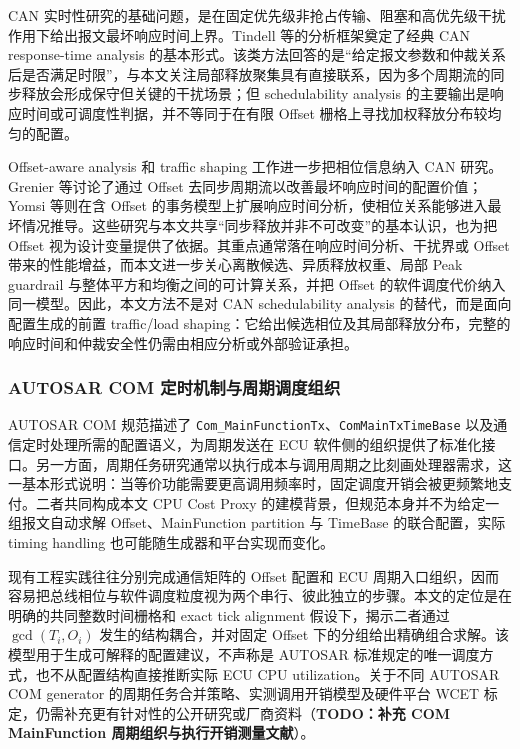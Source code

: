 \documentclass[UTF8,12pt,a4paper]{ctexart}
\begin{document}
CAN 实时性研究的基础问题，是在固定优先级非抢占传输、阻塞和高优先级干扰作用下给出报文最坏响应时间上界。Tindell 等的分析框架奠定了经典 CAN response-time analysis 的基本形式\cite{tindell1994}。该类方法回答的是“给定报文参数和仲裁关系后是否满足时限”，与本文关注局部释放聚集具有直接联系，因为多个周期流的同步释放会形成保守但关键的干扰场景；但 schedulability analysis 的主要输出是响应时间或可调度性判据，并不等同于在有限 Offset 栅格上寻找加权释放分布较均匀的配置。

Offset-aware analysis 和 traffic shaping 工作进一步把相位信息纳入 CAN 研究。Grenier 等讨论了通过 Offset 去同步周期流以改善最坏响应时间的配置价值\cite{grenier2008}；Yomsi 等则在含 Offset 的事务模型上扩展响应时间分析，使相位关系能够进入最坏情况推导\cite{yomsi2012}。这些研究与本文共享“同步释放并非不可改变”的基本认识，也为把 Offset 视为设计变量提供了依据。其重点通常落在响应时间分析、干扰界或 Offset 带来的性能增益，而本文进一步关心离散候选、异质释放权重、局部 Peak guardrail 与整体平方和均衡之间的可计算关系，并把 Offset 的软件调度代价纳入同一模型。因此，本文方法不是对 CAN schedulability analysis 的替代，而是面向配置生成的前置 traffic/load shaping：它给出候选相位及其局部释放分布，完整的响应时间和仲裁安全性仍需由相应分析或外部验证承担。

\subsubsection{AUTOSAR COM 定时机制与周期调度组织}

AUTOSAR COM 规范描述了 \texttt{Com\_MainFunctionTx}、\texttt{ComMainTxTimeBase} 以及通信定时处理所需的配置语义\cite{autosarcom}，为周期发送在 ECU 软件侧的组织提供了标准化接口。另一方面，周期任务研究通常以执行成本与调用周期之比刻画处理器需求\cite{liu1973}，这一基本形式说明：当等价功能需要更高调用频率时，固定调度开销会被更频繁地支付。二者共同构成本文 CPU Cost Proxy 的建模背景，但规范本身并不为给定一组报文自动求解 Offset、MainFunction partition 与 TimeBase 的联合配置，实际 timing handling 也可能随生成器和平台实现而变化。

现有工程实践往往分别完成通信矩阵的 Offset 配置和 ECU 周期入口组织，因而容易把总线相位与软件调度粒度视为两个串行、彼此独立的步骤。本文的定位是在明确的共同整数时间栅格和 exact tick alignment 假设下，揭示二者通过 $\gcd(T_i,O_i)$ 发生的结构耦合，并对固定 Offset 下的分组给出精确组合求解。该模型用于生成可解释的配置建议，不声称是 AUTOSAR 标准规定的唯一调度方式，也不从配置结构直接推断实际 ECU CPU utilization。关于不同 AUTOSAR COM generator 的周期任务合并策略、实测调用开销模型及硬件平台 WCET 标定，仍需补充更有针对性的公开研究或厂商资料（\textbf{TODO：补充 COM MainFunction 周期组织与执行开销测量文献}）。
\end{document}
